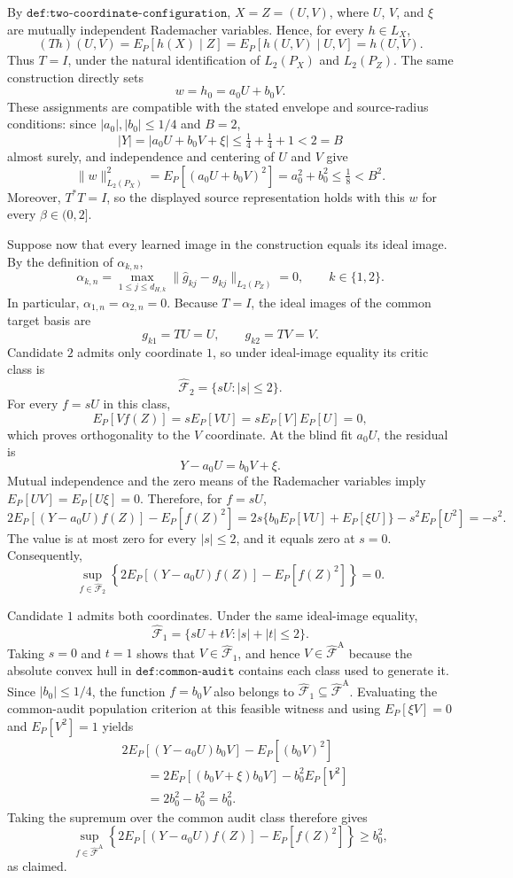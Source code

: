 By \(\texttt{def:two-coordinate-configuration}\), \(X=Z=(U,V)\), where \(U\), \(V\), and \(\xi\) are mutually independent Rademacher variables. Hence, for every \(h\in L_X\),
\[
(Th)(U,V)=E_P[h(X)\mid Z]=E_P[h(U,V)\mid U,V]=h(U,V).
\]
Thus \(T=I\), under the natural identification of \(L_2(P_X)\) and \(L_2(P_Z)\). The same construction directly sets
\[
w=h_0=a_0U+b_0V.
\]
These assignments are compatible with the stated envelope and source-radius conditions: since \(|a_0|,|b_0|\le 1/4\) and \(B=2\),
\[
|Y|=|a_0U+b_0V+\xi|\le \tfrac14+\tfrac14+1<2=B
\]
almost surely, and independence and centering of \(U\) and \(V\) give
\[
\|w\|_{L_2(P_X)}^2=E_P[(a_0U+b_0V)^2]=a_0^2+b_0^2\le \tfrac18<B^2.
\]
Moreover, \(T^*T=I\), so the displayed source representation holds with this \(w\) for every \(\beta\in(0,2]\).

Suppose now that every learned image in the construction equals its ideal image. By the definition of \(\alpha_{k,n}\),
\[
\alpha_{k,n}=\max_{1\le j\le d_{H,k}}\|\widehat g_{kj}-g_{kj}\|_{L_2(P_Z)}=0,
\qquad k\in\{1,2\}.
\]
In particular, \(\alpha_{1,n}=\alpha_{2,n}=0\). Because \(T=I\), the ideal images of the common target basis are
\[
g_{k1}=T U=U,
\qquad
g_{k2}=T V=V.
\]
Candidate \(2\) admits only coordinate \(1\), so under ideal-image equality its critic class is
\[
\widehat{\mathcal F}_2=\{sU:|s|\le2\}.
\]
For every \(f=sU\) in this class,
\[
E_P[Vf(Z)]=sE_P[VU]=sE_P[V]E_P[U]=0,
\]
which proves orthogonality to the \(V\) coordinate. At the blind fit \(a_0U\), the residual is
\[
Y-a_0U=b_0V+\xi.
\]
Mutual independence and the zero means of the Rademacher variables imply \(E_P[UV]=E_P[U\xi]=0\). Therefore, for \(f=sU\),
\[
2E_P[(Y-a_0U)f(Z)]-E_P[f(Z)^2]
=2s\{b_0E_P[VU]+E_P[\xi U]\}-s^2E_P[U^2]
=-s^2.
\]
The value is at most zero for every \(|s|\le2\), and it equals zero at \(s=0\). Consequently,
\[
\sup_{f\in\widehat{\mathcal F}_2}
\left\{2E_P[(Y-a_0U)f(Z)]-E_P[f(Z)^2]\right\}=0.
\]

Candidate \(1\) admits both coordinates. Under the same ideal-image equality,
\[
\widehat{\mathcal F}_1=\{sU+tV:|s|+|t|\le2\}.
\]
Taking \(s=0\) and \(t=1\) shows that \(V\in\widehat{\mathcal F}_1\), and hence \(V\in\widehat{\mathcal F}^{\mathrm A}\) because the absolute convex hull in \(\texttt{def:common-audit}\) contains each class used to generate it. Since \(|b_0|\le1/4\), the function \(f=b_0V\) also belongs to \(\widehat{\mathcal F}_1\subseteq\widehat{\mathcal F}^{\mathrm A}\). Evaluating the common-audit population criterion at this feasible witness and using \(E_P[\xi V]=0\) and \(E_P[V^2]=1\) yields
\[
\begin{aligned}
&2E_P[(Y-a_0U)b_0V]-E_P[(b_0V)^2]\\
&\qquad=2E_P[(b_0V+\xi)b_0V]-b_0^2E_P[V^2]\\
&\qquad=2b_0^2-b_0^2=b_0^2.
\end{aligned}
\]
Taking the supremum over the common audit class therefore gives
\[
\sup_{f\in\widehat{\mathcal F}^{\mathrm A}}
\left\{2E_P[(Y-a_0U)f(Z)]-E_P[f(Z)^2]\right\}\ge b_0^2,
\]
as claimed.